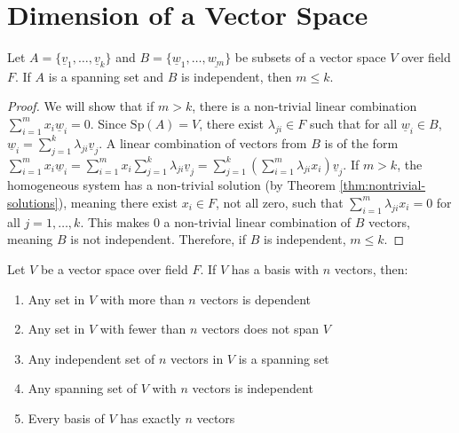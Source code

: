 
\section{Dimension of a Vector Space}

\begin{lemma}\label{lem:steinitz}
    Let $A = \{\underline{v}_1, \ldots, \underline{v}_k\}$ and $B = \{\underline{w}_1, \ldots, \underline{w_m}\}$ be subsets of a vector space $V$ over field $F$. If $A$ is a spanning set and $B$ is independent, then $m \leq k$.
\end{lemma}

\begin{proof}
    We will show that if $m > k$, there is a non-trivial linear combination $\sum_{i=1}^{m} x_i \underline{w}_i = 0$.
    Since $\mathrm{Sp}(A) = V$, there exist $\lambda_{ji} \in F$ such that for all $\underline{w}_i \in B$,
    $\underline{w}_i = \sum_{j=1}^{k} \lambda_{ji} \underline{v}_j$.
    A linear combination of vectors from $B$ is of the form
    $\sum_{i=1}^{m} x_i \underline{w}_i = \sum_{i=1}^{m} x_i \sum_{j=1}^{k} \lambda_{ji} \underline{v}_j = \sum_{j=1}^{k} \left(\sum_{i=1}^{m} \lambda_{ji} x_i\right) \underline{v}_j$.
    If $m > k$, the homogeneous system has a non-trivial solution (by Theorem \ref{thm:nontrivial-solutions}), meaning there exist $x_i \in F$, not all zero, such that $\sum_{i=1}^{m} \lambda_{ji} x_i = 0$ for all $j = 1, \ldots, k$. This makes $0$ a non-trivial linear combination of $B$ vectors, meaning $B$ is not independent. Therefore, if $B$ is independent, $m \leq k$.
\end{proof}

\begin{theorem}\label{thm:n-basis-properties}
    Let $V$ be a vector space over field $F$. If $V$ has a basis with $n$ vectors, then:
    \begin{enumerate}[label=(\roman*)]
        \item Any set in $V$ with more than $n$ vectors is dependent
        \item Any set in $V$ with fewer than $n$ vectors does not span $V$
        \item Any independent set of $n$ vectors in $V$ is a spanning set
        \item Any spanning set of $V$ with $n$ vectors is independent
        \item Every basis of $V$ has exactly $n$ vectors
    \end{enumerate}
\end{theorem}

